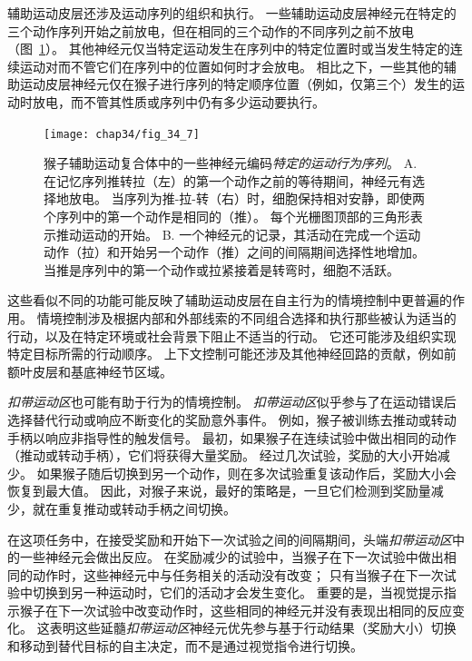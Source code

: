 辅助运动皮层还涉及运动序列的组织和执行。
一些辅助运动皮层神经元在特定的三个动作序列开始之前放电，但在相同的三个动作的不同序列之前不放电（图~\ref{fig:34_7}）。
其他神经元仅当特定运动发生在序列中的特定位置时或当发生特定的连续运动对而不管它们在序列中的位置如何时才会放电。
相比之下，一些其他的辅助运动皮层神经元仅在猴子进行序列的特定顺序位置（例如，仅第三个）发生的运动时放电，而不管其性质或序列中仍有多少运动要执行。


\begin{figure}[htbp]
	\centering
	\texttt{[image: chap34/fig\_34\_7]}
	\caption{猴子辅助运动复合体中的一些神经元编码\textit{特定的运动行为序列}\cite{tanji2001sequential}。
		A. 在记忆序列推转拉（左）的第一个动作之前的等待期间，神经元有选择地放电。
		当序列为推-拉-转（右）时，细胞保持相对安静，即使两个序列中的第一个动作是相同的（推）。
		每个光栅图顶部的三角形表示推动运动的开始。
		B. 一个神经元的记录，其活动在完成一个运动动作（拉）和开始另一个动作（推）之间的间隔期间选择性地增加。
		当推是序列中的第一个动作或拉紧接着是转弯时，细胞不活跃。}
	\label{fig:34_7}
\end{figure}


这些看似不同的功能可能反映了辅助运动皮层在自主行为的情境控制中更普遍的作用。
情境控制涉及根据内部和外部线索的不同组合选择和执行那些被认为适当的行动，以及在特定环境或社会背景下阻止不适当的行动。
它还可能涉及组织实现特定目标所需的行动顺序。
上下文控制可能还涉及其他神经回路的贡献，例如前额叶皮层和基底神经节区域。


\textit{扣带运动区}也可能有助于行为的情境控制。
\textit{扣带运动区}似乎参与了在运动错误后选择替代行动或响应不断变化的奖励意外事件。
例如，猴子被训练去推动或转动手柄以响应非指导性的触发信号。
最初，如果猴子在连续试验中做出相同的动作（推动或转动手柄），它们将获得大量奖励。
经过几次试验，奖励的大小开始减少。
如果猴子随后切换到另一个动作，则在多次试验重复该动作后，奖励大小会恢复到最大值。
因此，对猴子来说，最好的策略是，一旦它们检测到奖励量减少，就在重复推动或转动手柄之间切换。


在这项任务中，在接受奖励和开始下一次试验之间的间隔期间，头端\textit{扣带运动区}中的一些神经元会做出反应。
在奖励减少的试验中，当猴子在下一次试验中做出相同的动作时，这些神经元中与任务相关的活动没有改变；
只有当猴子在下一次试验中切换到另一种运动时，它们的活动才会发生变化。
重要的是，当视觉提示指示猴子在下一次试验中改变动作时，这些相同的神经元并没有表现出相同的反应变化。
这表明这些延髓\textit{扣带运动区}神经元优先参与基于行动结果（奖励大小）切换和移动到替代目标的自主决定，而不是通过视觉指令进行切换。



